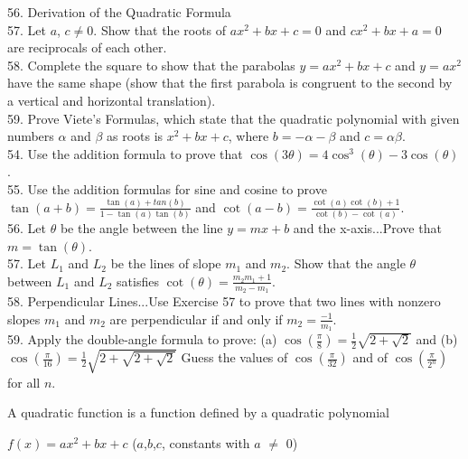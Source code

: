 \documentclass{article}
\begin{document}
56.  Derivation of the Quadratic Formula\\

57. Let $a$, $c \neq 0$. Show that the roots of $ax^2 + bx + c = 0$ and $cx^2 + bx + a = 0$ are reciprocals of each other.\\

58. Complete the square to show that the parabolas $y = ax^2 + bx + c$ and $y = ax^2$ have the same shape (show that the first parabola is congruent to the second by a vertical and horizontal translation).\\

59. Prove Viete's Formulas, which state that the quadratic polynomial with given numbers $\alpha$ and $\beta$ as roots is $x^2 + bx + c$, where $b = -\alpha - \beta$ and $c = \alpha\beta$.\\

54. Use the addition formula to prove that $\cos(3\theta)= 4\cos^3(\theta) - 3\cos(\theta)$.\\

55. Use the addition formulas for sine and cosine to prove $\tan(a + b) = \frac{\tan(a) + tan(b)}{1 - \tan(a)\tan(b)}$ and $\cot(a - b) = \frac{\cot(a)\cot(b) + 1}{\cot(b) - \cot(a)}$.\\

56. Let $\theta$ be the angle between the line $y = mx + b$ and the x-axis...Prove that $m = \tan(\theta)$.\\

57. Let $L_1$ and $L_2$ be the lines of slope $m_1$ and $m_2$. Show that the angle $\theta$ between $L_1$ and $L_2$ satisfies $\cot(\theta) = \frac{m_2m_1 + 1}{m_2 - m_1}$.\\

58. Perpendicular Lines...Use Exercise 57 to prove that two lines with nonzero slopes $m_1$ and $m_2$ are perpendicular if and only if $m_2 = \frac{-1}{m_1}$.\\

59. Apply the double-angle formula to prove: (a) $\cos(\frac{\pi}{8}) = \frac{1}{2}\sqrt{2 + \sqrt{2}}$ and (b) $\cos(\frac{\pi}{16}) = \frac{1}{2}\sqrt{2 + \sqrt{2 + \sqrt{2}}}$ Guess the values of $\cos(\frac{\pi}{32})$ and of $\cos(\frac{\pi}{2^n})$ for all $n$.

\newpage

A quadratic function is a function defined by a quadratic polynomial\\
\begin{center}$f(x) = ax^2 + bx + c$ ($a$,$b$,$c$, constants with $a$ $\neq$ 0)\\\end{center}
\end{document}

